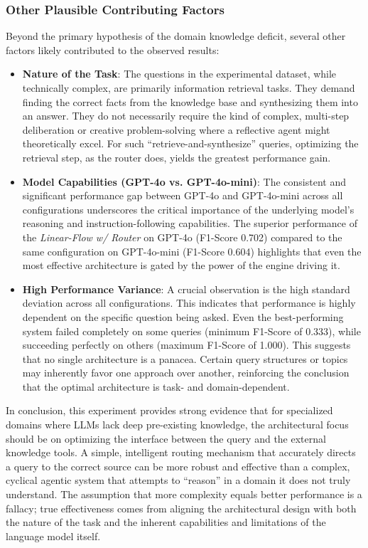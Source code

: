         \subsubsection{Other Plausible Contributing Factors}
        
            Beyond the primary hypothesis of the domain knowledge deficit, several other factors likely contributed to the observed results:
            
            \begin{itemize}
                \item \textbf{Nature of the Task}: The questions in the experimental dataset, while technically complex, are primarily information retrieval tasks. They demand finding the correct facts from the knowledge base and synthesizing them into an answer. They do not necessarily require the kind of complex, multi-step deliberation or creative problem-solving where a reflective agent might theoretically excel. For such ``retrieve-and-synthesize'' queries, optimizing the retrieval step, as the router does, yields the greatest performance gain.
                
                \item \textbf{Model Capabilities (GPT-4o vs. GPT-4o-mini)}: The consistent and significant performance gap between GPT-4o and GPT-4o-mini across all configurations underscores the critical importance of the underlying model's reasoning and instruction-following capabilities. The superior performance of the \textit{Linear-Flow w/ Router} on GPT-4o (F1-Score 0.702) compared to the same configuration on GPT-4o-mini (F1-Score 0.604) highlights that even the most effective architecture is gated by the power of the engine driving it.
                
                \item \textbf{High Performance Variance}: A crucial observation is the high standard deviation across all configurations. This indicates that performance is highly dependent on the specific question being asked. Even the best-performing system failed completely on some queries (minimum F1-Score of 0.333), while succeeding perfectly on others (maximum F1-Score of 1.000). This suggests that no single architecture is a panacea. Certain query structures or topics may inherently favor one approach over another, reinforcing the conclusion that the optimal architecture is task- and domain-dependent.
            \end{itemize}
            
            In conclusion, this experiment provides strong evidence that for specialized domains where LLMs lack deep pre-existing knowledge, the architectural focus should be on optimizing the interface between the query and the external knowledge tools. A simple, intelligent routing mechanism that accurately directs a query to the correct source can be more robust and effective than a complex, cyclical agentic system that attempts to ``reason'' in a domain it does not truly understand. The assumption that more complexity equals better performance is a fallacy; true effectiveness comes from aligning the architectural design with both the nature of the task and the inherent capabilities and limitations of the language model itself.